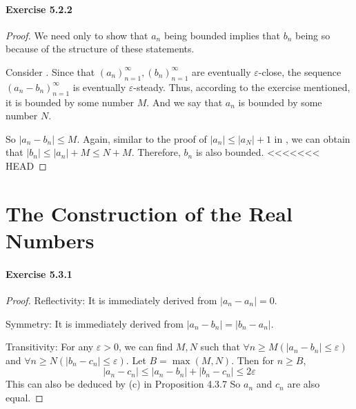 \paragraph{Exercise 5.2.2} \label{exercise5.2.2}
\begin{proof}
We need only to show that $a_n$ being bounded implies that $b_n$ being so because of the structure of these statements.

Consider . Since that $(a_n)^\infty_{n=1},(b_n)^\infty_{n=1}$ are eventually $\varepsilon$-close, the sequence
$(a_n-b_n)^\infty_{n=1}$ is eventually $\varepsilon$-steady. Thus, according to the exercise mentioned, it is bounded by some number $M$. And
we say that $a_n$ is bounded by some number $N$.

So $|a_n-b_n| \leq M$. Again, similar to the proof of $|a_n| \leq |a_N|+1$ in , we can obtain that
$|b_n| \leq |a_n| + M \leq N+M$. Therefore, $b_n$ is also bounded.
<<<<<<< HEAD
\end{proof}

\section{The Construction of the Real Numbers}
\paragraph{Exercise 5.3.1} \label{exercise5.3.1}
\begin{proof}
Reflectivity: It is immediately derived from $|a_n-a_n| = 0$.

Symmetry: It is immediately derived from $|a_n-b_n| = |b_n-a_n|$.

Transitivity: For any $\varepsilon >0$, we can find $M,N$ such that $\forall n\geq M(|a_n-b_n| \leq \varepsilon)$ and
$\forall n\geq N(|b_n-c_n| \leq \varepsilon)$. Let $B = \max{(M,N)}$. Then for $n\geq B$,
\[
|a_n-c_n| \leq |a_n-b_n| + |b_n-c_n| \leq 2\varepsilon
\]
This can also be deduced by (c) in Proposition 4.3.7
So $a_n$ and $c_n$ are also equal.
\end{proof}

